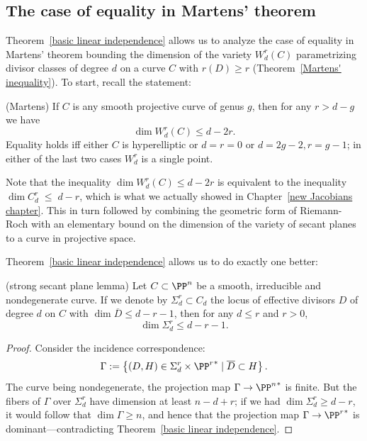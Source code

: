 \subsection{The case of equality in Martens' theorem}

Theorem~\ref{basic linear independence}  allows us to analyze the case of equality in Martens' theorem bounding the dimension of the variety $W^r_d(C)$ parametrizing divisor classes of degree $d$ on a curve $C$ with $r(D) \geq r$
(Theorem~\ref{Martens' inequality}).
To start, recall the statement:

\begin{theorem}(Martens)\label{full Martens}
If $C$ is any smooth projective curve of genus $g$, then for any $r>d-g$ we have
$$
\dim W^r_d(C) \leq d-2r.
$$
Equality holds iff either $C$ is hyperelliptic
or $d=r=0$ or $d=2g-2, r=g-1$; in either of the last two cases $W^r_d$ is
a single point.
\end{theorem}

Note that the inequality $\dim W^r_d(C) \leq d-2r$ is equivalent to the inequality $\dim C^r_d \; \leq \; d-r$, which is what we actually showed in Chapter~\ref{new Jacobians chapter}. This in turn followed by combining the geometric form of Riemann-Roch with an elementary bound on the dimension of the variety of secant planes to a curve in projective space.

Theorem~\ref{basic linear independence} allows us to do exactly one better: 

\begin{lemma}(strong secant plane lemma)\label{Strong secant plane lemma}
Let $C \subset \PP^n$ be a smooth, irreducible and nondegenerate curve. If we denote by $\Sigma^r_d \subset C_d$ the locus of effective divisors $D$ of degree $d$ on $C$ with $\dim \overline D \leq d-r-1$, then for any $d \leq r$ and $r > 0$,
$$
\dim \Sigma^r_d \leq d-r-1.
$$
\end{lemma}

\begin{proof}
Consider the incidence correspondence: 
$$
\Gamma := \left\{ (D, H) \in \Sigma^r_d\times {\PP^r}^* \mid \overline D \subset H \right\}.
$$
The curve being nondegenerate, the projection map $\Gamma \to  {\PP^n}^*$ is finite. But the fibers of $\Gamma$ over $\Sigma^r_d$ have dimension at least $n-d+r$; if we had $\dim \Sigma^r_d \geq d-r$, it would follow that $\dim \Gamma \geq n$, and hence that the projection map $\Gamma \to  {\PP^r}^*$ is dominant---contradicting Theorem~\ref{basic linear independence}.
\end{proof}

